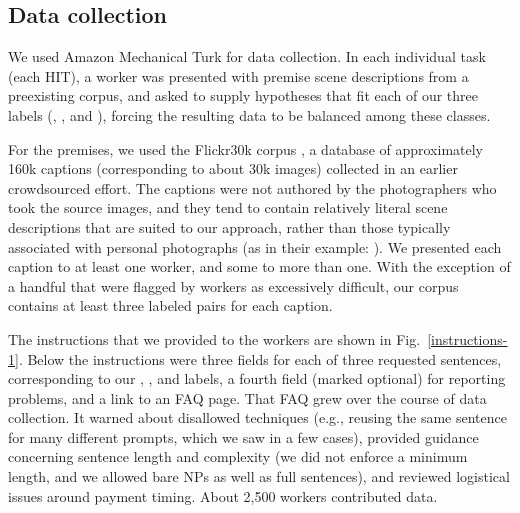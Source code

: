 \subsection{Data collection}

We used Amazon Mechanical Turk for data collection. In each individual task (each HIT), a worker was presented with premise scene descriptions from a preexisting corpus, and asked to supply hypotheses that fit each of our three labels (, , and ), forcing the resulting data to be balanced among these classes.

For the premises, we used the Flickr30k corpus \cite{hodoshimage}, a database of approximately 160k captions  (corresponding to about 30k images) collected in an earlier crowdsourced effort. The captions were not authored by the photographers who took the source images, and they tend to contain relatively literal scene descriptions that are suited to our approach, rather than those typically associated with personal photographs (as in their example: ). We presented each caption to at least one worker, and some to more than one. With the exception of a handful that were flagged by workers as excessively difficult, our corpus contains at least three labeled pairs for each caption.

The instructions that we provided to the workers are shown in Fig.~\ref{instructions-1}. Below the instructions were three fields for each of three requested sentences, corresponding to our , , and  labels, a fourth field (marked optional) for reporting problems, and a link to an FAQ page. That FAQ grew over the course of data collection. It warned about disallowed techniques (e.g., reusing the same sentence for many different prompts, which we saw in a few cases), provided guidance concerning sentence length and complexity (we did not enforce a minimum length, and we allowed bare NPs as well as full sentences), and reviewed logistical issues around payment timing. About 2,500 workers contributed data.

